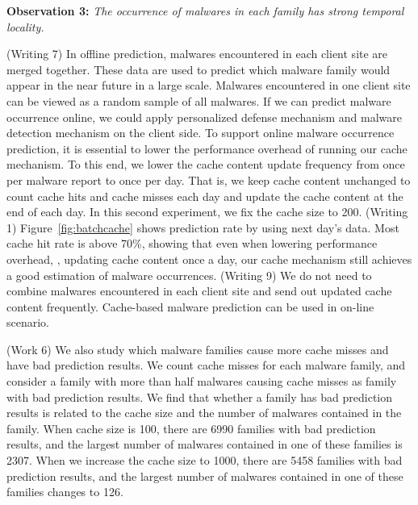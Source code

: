 {\bf Observation 3:} 
{\em The occurrence of malwares in each family has strong temporal locality.}  

{\color{red} (Writing 7)
In offline prediction, malwares encountered in each client site are merged together. 
These data are used to predict which malware family would appear in the near future in a large scale.
Malwares encountered in one client site can be viewed as a random sample of all malwares. 
If we can predict malware occurrence online, we could apply personalized defense mechanism and malware detection mechanism on the client side. 
}
To support online malware occurrence prediction, it is essential to lower the 
performance overhead of running our cache mechanism.
To this end, we lower the cache content update frequency from once per malware report to once per day.
That is, we keep cache content unchanged to count cache hits and cache misses each day and update the cache content at the end of each day.
In this second experiment, we fix the cache size to 200. 
{\color{red} (Writing 1)
Figure~\ref{fig:batchcache} shows prediction rate by using next day’s data. 
Most cache hit rate is above 70\%,
showing that even when lowering performance overhead, \ie, updating cache content once a day, 
our cache mechanism still achieves a good estimation of malware occurrences.
}   
{\color{red} (Writing 9)
We do not need to combine malwares encountered in each client site and send out updated cache content frequently. Cache-based malware prediction can be used in on-line scenario. 
}

{\color{red} (Work 6)
We also study which malware families cause more cache misses 
and have bad prediction results. 
We count cache misses for each malware family, 
and consider a family with more than half malwares causing cache misses as family with bad prediction results. 
We find that whether a family has bad prediction results is related to the cache size and the number of malwares contained in the family. 
When cache size is 100, there are 6990 families with bad prediction results, 
and the largest number of malwares contained in one of these families is 2307. 
When we increase the cache size to 1000, 
there are 5458 families with bad prediction results, 
and the largest number of malwares contained in one of these families changes to 126. 
}


